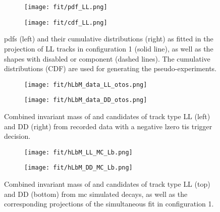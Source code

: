 \begin{figure}[htbp]
    \centering
    \begin{subfigure}[b]{.49\textwidth}
        \centering
        \texttt{[image: fit/pdf\_LL.png]}
    \end{subfigure}
    \begin{subfigure}[b]{.49\textwidth}
        \centering
        \texttt{[image: fit/cdf\_LL.png]}
    \end{subfigure}
    \caption{\Glspl{pdf} (left) and their cumulative distributions (right) as fitted in the projection of \gls{LL} tracks in configuration 1 (solid line), as well as the shapes with disabled \decay{\Lb}{\Dz\Lz} or \decay{\Xibz}{\Dz\Lz} component (dashed lines). The cumulative distributions (CDF) are used for generating the pseudo-experiments.}
    \label{fig:fit_toy_pdf_cdf}
\end{figure}

\begin{figure}[htbp]
    \centering
    \begin{subfigure}[b]{.49\textwidth}
        \centering
        \texttt{[image: fit/hLbM\_data\_LL\_otos.png]}
    \end{subfigure}
    \begin{subfigure}[b]{.49\textwidth}
        \centering
        \texttt{[image: fit/hLbM\_data\_DD\_otos.png]}
    \end{subfigure}
    \caption{Combined invariant mass of \Dz and \Lz candidates of track type \gls{LL} (left) and \gls{DD} (right) from recorded data with a negative \gls{lzero} \gls{tis} trigger decision.}
    \label{fig:fit_hLbM_data_LLDD_otos}
\end{figure}


\begin{figure}[htbp]
    \centering
    \begin{subfigure}[b]{\textwidth}
        \centering
        \texttt{[image: fit/hLbM\_LL\_MC\_Lb.png]}
    \end{subfigure}
    \par\bigskip 
    \begin{subfigure}[b]{\textwidth}
        \centering
        \texttt{[image: fit/hLbM\_DD\_MC\_Lb.png]}
    \end{subfigure}
    \caption{Combined invariant mass of \Dz and \Lz candidates of track type \gls{LL} (top) and \gls{DD} (bottom) from \gls{mc} simulated \decay{\Lb}{\Dz\Lz} decays, as well as the corresponding projections of the simultaneous fit in configuration 1.}
    \label{fig:fit_hLbM_MC_Lb}
\end{figure}

